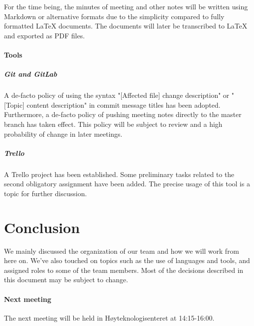 \documentclass{article}
\begin{document}
For the time being, the minutes of meeting and other notes will be written using Markdown or alternative formats due to the simplicity compared to fully formatted LaTeX documents. The documents will later be transcribed to LaTeX and exported as PDF files.

\paragraph{Tools}

\subparagraph{Git and GitLab}

A de-facto policy of using the syntax "[Affected file] change description" or "[Topic] content description" in commit message titles has been adopted. Furthermore, a de-facto policy of pushing meeting notes directly to the master branch has taken effect. This policy will be subject to review and a high probability of change in later meetings.

\subparagraph{Trello}

A Trello project has been established. Some preliminary tasks related to the second obligatory assignment have been added. The precise usage of this tool is a topic for further discussion.

\section{Conclusion}

We mainly discussed the organization of our team and how we will work from here on. We've also touched on topics such as the use of languages and tools, and assigned roles to some of the team members. Most of the decisions described in this document may be subject to change.

\paragraph{Next meeting}

The next meeting will be held in Høyteknologisenteret at 14:15-16:00.
\end{document}
